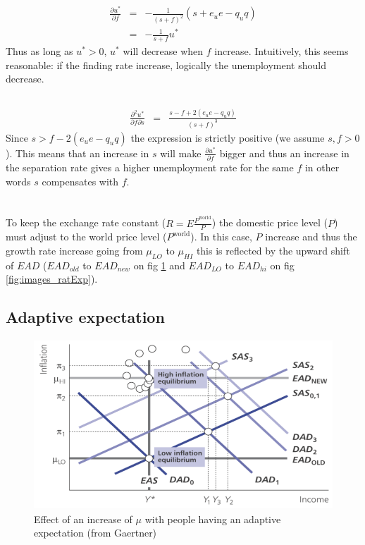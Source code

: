 \documentclass[a4paper] {scrartcl}
\begin{document}
\subsection{ }
\begin{eqnarray}
	\frac{\partial u^*}{\partial f} &=& -\frac{1}{(s+f)^2}\left(s+e_ue-q_uq\right)\\
	&=&  -\frac{1}{s+f}u^*
\end{eqnarray}
Thus as long as $u^*>0$, $u^*$ will decrease when $f$ increase. Intuitively, this seems reasonable: if the finding rate increase, logically the unemployment should decrease. 

\subsection{ }
\begin{eqnarray}
	\frac{\partial^2u^*}{\partial f\partial s}
	&=&
	\frac{s-f+2(e_ue-q_uq)}{(s+f)^3}
\end{eqnarray}
Since $s>f-2(e_ue-q_uq)$ the expression is strictly positive (we assume $s,f>0$). This means that an increase in $s$ will make $\frac{\partial u^*}{\partial f}$ bigger and thus an increase in the separation rate gives a higher unemployment rate for the same $f$ in other words $s$ compensates with $f$.

\section{ }
To keep the exchange rate constant ($R=E\frac{P^{\text{world}}}{P}$) the domestic price level ($P$) must adjust to the world price level ($P^{\text{world}}$). In this case, $P$ increase and thus the growth rate increase going from $\mu_{LO}$ to $\mu_{HI}$ this is reflected by the upward shift of $EAD$ ($EAD_{old}$ to $EAD_{new}$ on fig \ref{fig:images_adapExp} and $EAD_{LO}$ to $EAD_{hi}$ on fig \ref{fig:images_ratExp}).

\subsection{Adaptive expectation}

\begin{figure}[htbp]
	\centering
		\includegraphics[height=2.5in]{images/adapExp.png}
	\caption{Effect of an increase of $\mu$ with people having an adaptive expectation (from Gaertner)}
	\label{fig:images_adapExp}
\end{figure}
\end{document}
